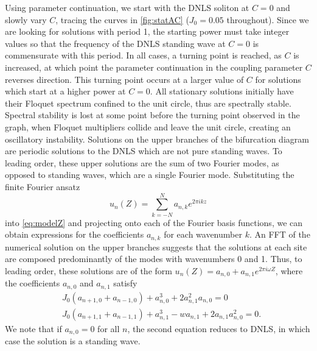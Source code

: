 \documentclass[reprint, amsmath,amssymb,aps,pre]{revtex4-2}
\begin{document}
Using parameter continuation, we start with the DNLS soliton at $C=0$ and slowly vary $C$, tracing the curves in \cref{fig:statAC} ($J_0 = 0.05$ throughout). Since we are looking for solutions with period 1, the starting power must take integer values so that the frequency of the DNLS standing wave at $C=0$ is commensurate with this period. In all cases, a turning point is reached, as $C$ is increased, at which point the parameter continuation in the
coupling parameter $C$ reverses direction. This turning point occurs at a larger value of $C$ for solutions which start at a higher power at $C=0$. All stationary solutions initially have their Floquet spectrum confined to the unit circle, thus are spectrally stable. Spectral stability is lost at some point before the turning point observed in the graph, when Floquet multipliers collide and leave the unit circle, creating an oscillatory instability. Solutions on the upper branches of the bifurcation diagram are periodic solutions to the DNLS which are not pure standing waves. To leading order, these upper solutions are the sum of two Fourier modes, %
as opposed to standing waves, which are a single Fourier mode. Substituting the finite Fourier ansatz 
\[
u_n(Z) = \sum_{k=-N}^N a_{n,k} e^{2 \pi i k z}
\]
into \cref{eq:modelZ} and projecting onto each of the Fourier basis functions, we can obtain expressions for the coefficients $a_{n,k}$ for each wavenumber $k$. An FFT of the numerical solution on the upper branches suggests that the solutions at each site are composed predominantly of the modes with wavenumbers 0 and 1. Thus, to leading order, these solutions are of the form $u_n(Z) = a_{n,0} + a_{n,1} e^{2 \pi i \omega Z}$, where the coefficients $a_{n,0}$ and $a_{n,1}$ satisfy 
\begin{align*}
&J_0(a_{n+1,0}+a_{n-1,0}) + a_{n,0}^3 + 2 a_{n,1}^2 a_{n,0} = 0 \\
&J_0(a_{n+1,1}+a_{n-1,1}) + a_{n,1}^3 - w a_{n,1} + 2 a_{n,1} a_{n,0}^2 = 0.
\end{align*}
We note that if $a_{n,0} = 0$ for all $n$, the second equation reduces to DNLS, in which case the solution is a standing wave.
\end{document}
